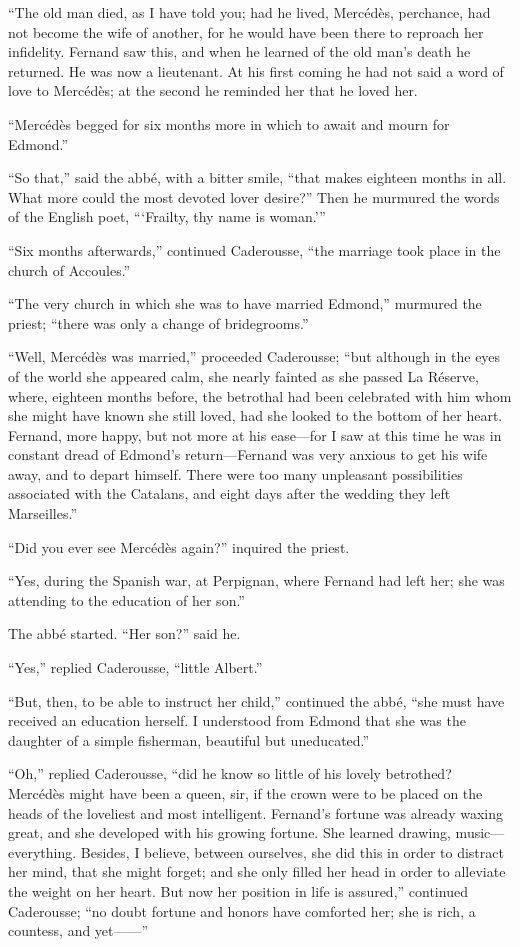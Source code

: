“The old man died, as I have told you; had he lived, Mercédès,
perchance, had not become the wife of another, for he would have been
there to reproach her infidelity. Fernand saw this, and when he learned
of the old man’s death he returned. He was now a lieutenant. At his
first coming he had not said a word of love to Mercédès; at the second
he reminded her that he loved her.

“Mercédès begged for six months more in which to await and mourn for
Edmond.”

“So that,” said the abbé, with a bitter smile, “that makes eighteen
months in all. What more could the most devoted lover desire?” Then he
murmured the words of the English poet, “‘Frailty, thy name is woman.’”

“Six months afterwards,” continued Caderousse, “the marriage took place
in the church of Accoules.”

“The very church in which she was to have married Edmond,” murmured the
priest; “there was only a change of bridegrooms.”

“Well, Mercédès was married,” proceeded Caderousse; “but although in
the eyes of the world she appeared calm, she nearly fainted as she
passed La Réserve, where, eighteen months before, the betrothal had
been celebrated with him whom she might have known she still loved, had
she looked to the bottom of her heart. Fernand, more happy, but not
more at his ease—for I saw at this time he was in constant dread of
Edmond’s return—Fernand was very anxious to get his wife away, and to
depart himself. There were too many unpleasant possibilities associated
with the Catalans, and eight days after the wedding they left
Marseilles.”

“Did you ever see Mercédès again?” inquired the priest.

“Yes, during the Spanish war, at Perpignan, where Fernand had left her;
she was attending to the education of her son.”

The abbé started. “Her son?” said he.

“Yes,” replied Caderousse, “little Albert.”

“But, then, to be able to instruct her child,” continued the abbé, “she
must have received an education herself. I understood from Edmond that
she was the daughter of a simple fisherman, beautiful but uneducated.”

“Oh,” replied Caderousse, “did he know so little of his lovely
betrothed? Mercédès might have been a queen, sir, if the crown were to
be placed on the heads of the loveliest and most intelligent. Fernand’s
fortune was already waxing great, and she developed with his growing
fortune. She learned drawing, music—everything. Besides, I believe,
between ourselves, she did this in order to distract her mind, that she
might forget; and she only filled her head in order to alleviate the
weight on her heart. But now her position in life is assured,”
continued Caderousse; “no doubt fortune and honors have comforted her;
she is rich, a countess, and yet——”

